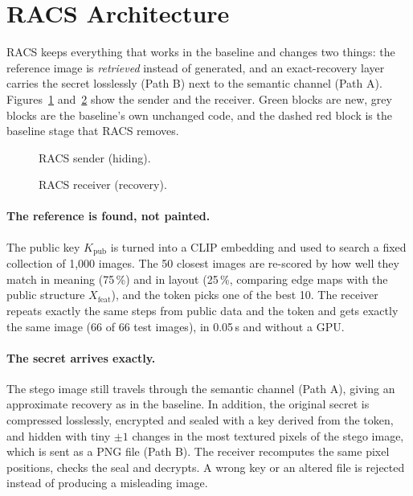 \section{RACS Architecture}
RACS keeps everything that works in the baseline and changes two things: the reference image is
\emph{retrieved} instead of generated, and an exact-recovery layer carries the secret losslessly
(Path B) next to the semantic channel (Path A). Figures~\ref{fig:racs-tx} and~\ref{fig:racs-rx}
show the sender and the receiver. Green blocks are new, grey blocks are the baseline's own
unchanged code, and the dashed red block is the baseline stage that RACS removes.

\begin{figure}[H]
	\centering
	
	\caption{RACS sender (hiding).}
	\label{fig:racs-tx}
\end{figure}

\begin{figure}[H]
	\centering
	
	\caption{RACS receiver (recovery).}
	\label{fig:racs-rx}
\end{figure}

\paragraph{The reference is found, not painted.} The public key $K_{\mathrm{pub}}$ is turned into
a CLIP embedding and used to search a fixed collection of 1{,}000 images. The 50 closest images
are re-scored by how well they match in meaning (75\,\%) and in layout (25\,\%, comparing edge
maps with the public structure $X_{\mathrm{feat}}$), and the token picks one of the best 10. The
receiver repeats exactly the same steps from public data and the token and gets exactly the same
image (66 of 66 test images), in 0.05\,s and without a GPU.

\paragraph{The secret arrives exactly.} The stego image still travels through the semantic
channel (Path A), giving an approximate recovery as in the baseline. In addition, the original
secret is compressed losslessly, encrypted and sealed with a key derived from the token, and
hidden with tiny $\pm1$ changes in the most textured pixels of the stego image, which is sent as a
PNG file (Path B). The receiver recomputes the same pixel positions, checks the seal and decrypts.
A wrong key or an altered file is rejected instead of producing a misleading image.

